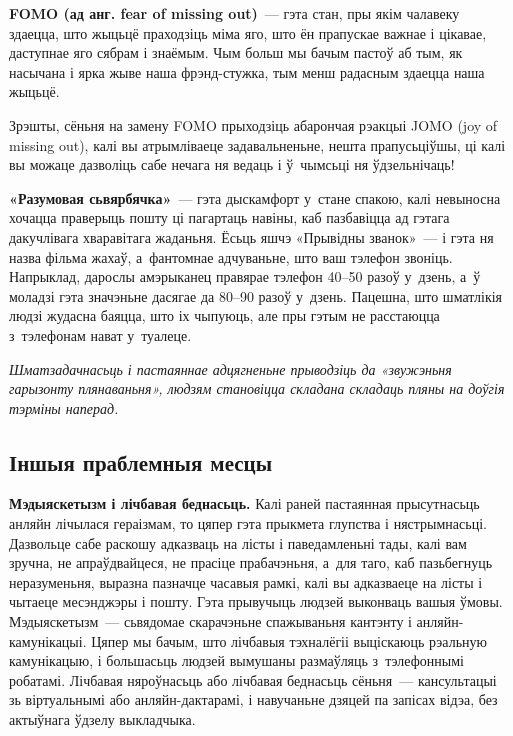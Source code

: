 \textbf{FOMO (ад анг. fear of missing out)}~--- гэта стан, пры якім чалавеку здаецца, што жыцьцё праходзіць міма яго, што ён прапускае важнае і цікавае, даступнае яго сябрам і знаёмым. Чым больш мы бачым пастоў аб тым, як насычана і ярка жыве наша фрэнд-стужка, тым менш радасным здаецца наша жыцьцё.


Зрэшты, сёньня на замену FOMO прыходзіць абарончая рэакцыі JOMO (joy of missing out), калі вы атрымліваеце задавальненьне, нешта прапусьціўшы, ці калі вы можаце дазволіць сабе нечага ня ведаць і ў~чымсьці ня ўдзельнічаць!

\textbf{«Разумовая сьвярбячка»}~--- гэта дыскамфорт у~стане спакою, калі невыносна хочацца праверыць пошту ці пагартаць навіны, каб пазбавіцца ад гэтага дакучлівага хваравітага жаданьня. Ёсьць яшчэ «Прывідны званок»~--- і гэта ня назва фільма жахаў, а~фантомнае адчуваньне, што ваш тэлефон звоніць. Напрыклад, дарослы амэрыканец правярае тэлефон 40--50 разоў у~дзень, а~ў моладзі гэта значэньне дасягае да 80--90 разоў у~дзень. Пацешна, што шматлікія людзі жудасна баяцца, што іх чыпуюць, але пры гэтым не расстаюцца з~тэлефонам нават у~туалеце.

\emph{Шматзадачнасьць і пастаяннае адцягненьне прыводзіць да «звужэньня гарызонту плянаваньня», людзям становіцца складана складаць пляны на доўгія тэрміны наперад.}

\subsection*{Іншыя праблемныя месцы}

\textbf{Мэдыяскетызм і лічбавая беднасьць.} Калі раней пастаянная прысутнасьць анляйн лічылася гераізмам, то цяпер гэта прыкмета глупства і нястрымнасьці. Дазвольце сабе раскошу адказваць на лісты і паведамленьні тады, калі вам зручна, не апраўдвайцеся, не прасіце прабачэньня, а~для таго, каб пазьбегнуць неразуменьня, выразна пазначце часавыя рамкі, калі вы адказваеце на лісты і чытаеце месэнджэры і пошту. Гэта прывучыць людзей выконваць вашыя ўмовы. Мэдыяскетызм~--- сьвядомае скарачэньне спажываньня кантэнту і анляйн-камунікацыі. Цяпер мы бачым, што лічбавыя тэхналёгіі выціскаюць рэальную камунікацыю, і большасьць людзей вымушаны размаўляць з~тэлефоннымі робатамі. Лічбавая няроўнасьць або лічбавая беднасьць сёньня~--- кансультацыі зь віртуальнымі або анляйн-дактарамі, і навучаньне дзяцей па запісах відэа, без актыўнага ўдзелу выкладчыка.

